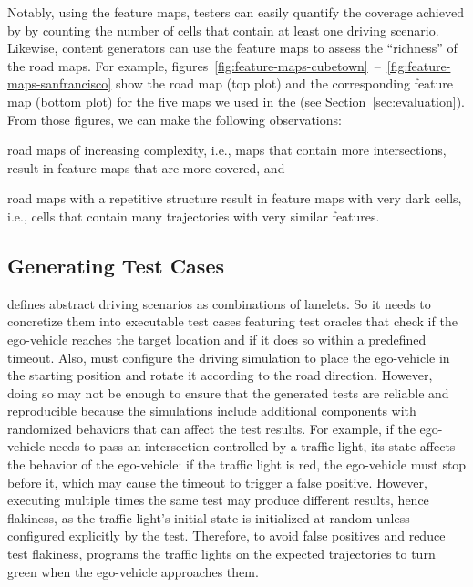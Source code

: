 \documentclass[conference]{IEEEtran}
\begin{document}
Notably, using the feature maps, testers can easily quantify the coverage achieved by \tool by counting the number of cells that contain at least one driving scenario. Likewise, content generators can use the feature maps to assess the ``richness'' of the road maps. 
%
For example, figures~\ref{fig:feature-maps-cubetown}~--~\ref{fig:feature-maps-sanfrancisco} show the road map (top plot) and the corresponding feature map (bottom plot) for the five maps we used in the \challenge (see Section~\ref{sec:evaluation}). From those figures, we can make the following observations: 
\begin{inparaenum}[(1)]
\item road maps of increasing complexity, i.e., maps that contain more intersections, result in feature maps that are more covered, 
and \item road maps with a repetitive structure result in feature maps with very dark cells, i.e., cells that contain many trajectories with very similar features.
\end{inparaenum}


\subsection{Generating Test Cases}
\tool defines abstract driving scenarios as combinations of lanelets. So it needs to concretize them into executable test cases featuring test oracles that check if the ego-vehicle reaches the target location and if it does so within a predefined timeout. Also, \tool must configure the driving simulation to place the ego-vehicle in the starting position and rotate it according to the road direction. However, doing so may not be enough to ensure that the generated tests are reliable and reproducible because the simulations include additional components with randomized behaviors that can affect the test results. For example, if the ego-vehicle needs to pass an intersection controlled by a traffic light, its state affects the behavior of the ego-vehicle: if the traffic light is red, the ego-vehicle must stop before it, which may cause the timeout to trigger a false positive. However, executing multiple times the same test may produce different results, hence flakiness, as the traffic light's initial state is initialized at random unless configured explicitly by the test. Therefore, to avoid false positives and reduce test flakiness, \tool programs the traffic lights on the expected trajectories to turn green when the ego-vehicle approaches them.
\end{document}
